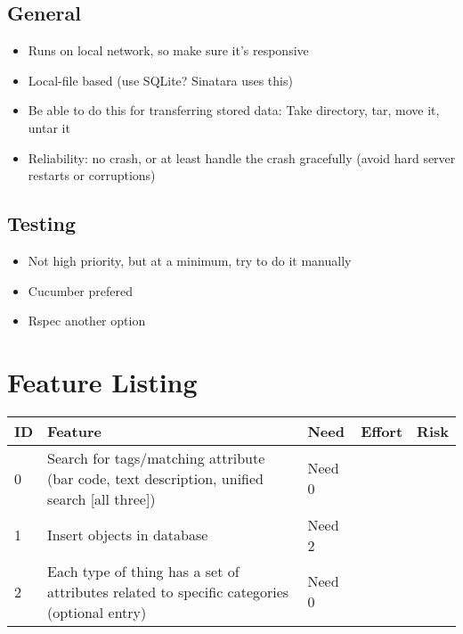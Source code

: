 \documentclass{article}
\begin{document}
\subsection{General}
\begin{itemize}
\item Runs on local network, so make sure it's responsive
\item Local-file based (use SQLite? Sinatara uses this)
\item Be able to do this for transferring stored data: Take directory, tar, move it, untar it
\item Reliability: no crash, or at least handle the crash gracefully (avoid hard server restarts or corruptions)
\end{itemize}

\subsection{Testing}
\begin{itemize}
\item Not high priority, but at a minimum, try to do it manually
\item Cucumber prefered
\item Rspec another option
\end{itemize}

\section{Feature Listing}
\begin{tabular}{ | p{0.25in} | p{3.25in} | p{0.5in} | p{0.5in} | p{0.5in} | }
\hline
\textbf{ID} & \textbf{Feature} & \textbf{Need} & \textbf{Effort} & \textbf{Risk}\\
\hline
\hline
0 & Search for tags/matching attribute (bar code, text description, unified search [all three]) & Need 0 &  & \\
\hline
1 & Insert objects in database & Need 2 &  & \\
\hline
2 & Each type of thing has a set of attributes related to specific categories (optional entry) & Need 0 &  & \\
\hline
\end{tabular}
\end{document}
